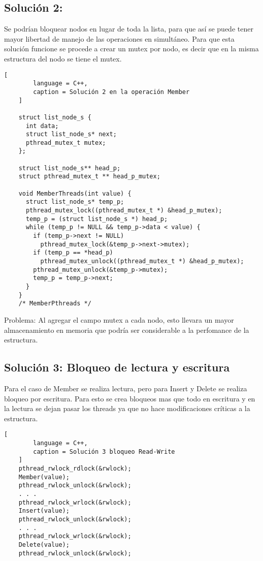 \documentclass[11pt]{article}
\begin{document}
    \subsection{Solución 2:}
    Se podrían bloquear nodos en lugar de toda la lista, para que así se puede tener
    mayor libertad de manejo de las operaciones en simultáneo. Para que esta solución
    funcione se procede a crear un mutex por nodo, es decir que en la misma estructura
    del nodo se tiene el mutex.
    \begin{lstlisting}[
        language = C++,
        caption = Solución 2 en la operación Member
    ]

    struct list_node_s {
      int data;
      struct list_node_s* next;
      pthread_mutex_t mutex;
    };

    struct list_node_s** head_p;
    struct pthread_mutex_t ** head_p_mutex;

    void MemberThreads(int value) {
      struct list_node_s* temp_p;
      pthread_mutex_lock((pthread_mutex_t *) &head_p_mutex);
      temp_p = (struct list_node_s *) head_p;
      while (temp_p != NULL && temp_p->data < value) {
        if (temp_p->next != NULL)
          pthread_mutex_lock(&temp_p->next->mutex);
        if (temp_p == *head_p)
          pthread_mutex_unlock((pthread_mutex_t *) &head_p_mutex);
        pthread_mutex_unlock(&temp_p->mutex);
        temp_p = temp_p->next;
      }
    }
    /* MemberPthreads */
    \end{lstlisting}
    Problema: Al agregar el campo mutex a cada nodo, esto llevara un mayor almacenamiento
    en memoria que podría ser considerable a la perfomance de la estructura.

    \subsection{Solución 3: Bloqueo de lectura y escritura}
    Para el caso de Member se realiza lectura, pero para Insert y Delete se realiza
    bloqueo por escritura. Para esto se crea bloqueos mas que todo en escritura y en la
    lectura se dejan pasar los threads ya que no hace modificaciones críticas a la
    estructura.

    \begin{lstlisting}[
        language = C++,
        caption = Solución 3 bloqueo Read-Write
    ]
    pthread_rwlock_rdlock(&rwlock);
    Member(value);
    pthread_rwlock_unlock(&rwlock);
    . . .
    pthread_rwlock_wrlock(&rwlock);
    Insert(value);
    pthread_rwlock_unlock(&rwlock);
    . . .
    pthread_rwlock_wrlock(&rwlock);
    Delete(value);
    pthread_rwlock_unlock(&rwlock);
    \end{lstlisting}
\end{document}
